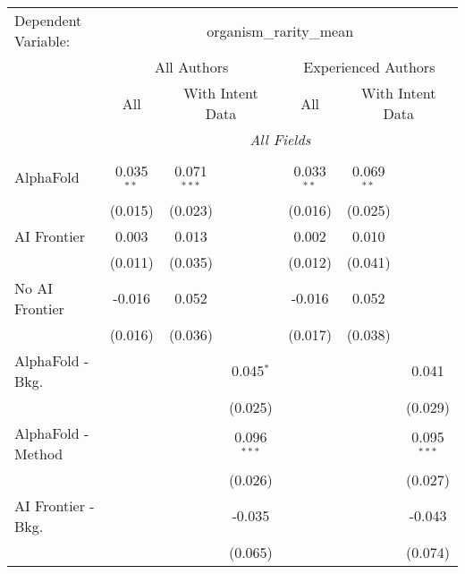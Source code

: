 \begingroup
\centering
\begin{tabular}{lcccccc}
   \tabularnewline \midrule \midrule
   Dependent Variable: & \multicolumn{6}{c}{organism\_rarity\_mean}\\
 & \multicolumn{3}{c}{All Authors} & \multicolumn{3}{c}{Experienced Authors} \\
\cmidrule(lr){2-4} \cmidrule(lr){5-7}
 & \multicolumn{1}{c}{All} & \multicolumn{2}{c}{With Intent Data} & \multicolumn{1}{c}{All} & \multicolumn{2}{c}{With Intent Data} \\
\cmidrule(lr){2-2} \cmidrule(lr){3-4} \cmidrule(lr){5-5} \cmidrule(lr){6-7}
 & \multicolumn{6}{c}{\textit{All Fields}} \\ \\
   AlphaFold               & 0.035$^{**}$ & 0.071$^{***}$ &               & 0.033$^{**}$ & 0.069$^{**}$ &   \\   
                           & (0.015)      & (0.023)       &               & (0.016)      & (0.025)      &   \\   
   AI Frontier             & 0.003        & 0.013         &               & 0.002        & 0.010        &   \\   
                           & (0.011)      & (0.035)       &               & (0.012)      & (0.041)      &   \\   
   No AI Frontier          & -0.016       & 0.052         &               & -0.016       & 0.052        &   \\   
                           & (0.016)      & (0.036)       &               & (0.017)      & (0.038)      &   \\   
   AlphaFold - Bkg.        &              &               & 0.045$^{*}$   &              &              & 0.041\\   
                           &              &               & (0.025)       &              &              & (0.029)\\   
   AlphaFold - Method      &              &               & 0.096$^{***}$ &              &              & 0.095$^{***}$\\   
                           &              &               & (0.026)       &              &              & (0.027)\\   
   AI Frontier - Bkg.      &              &               & -0.035        &              &              & -0.043\\   
                           &              &               & (0.065)       &              &              & (0.074)\\   

\end{tabular}
